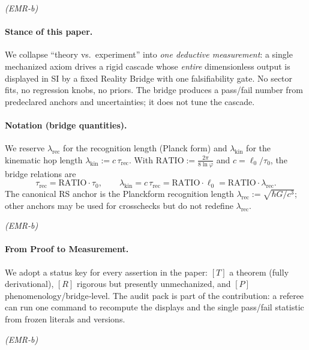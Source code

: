 \documentclass[11pt]{article}
\begin{document}
\medskip
\noindent\textit{(EMR-b)}

\paragraph{Stance of this paper.}
We collapse “theory vs.\ experiment” into \emph{one deductive measurement}: a single mechanized axiom drives a rigid cascade whose \emph{entire} dimensionless output is displayed in SI by a fixed Reality Bridge with one falsifiability gate. No sector fits, no regression knobs, no priors. The bridge produces a pass/fail number from predeclared anchors and uncertainties; it does not tune the cascade.

\medskip
\paragraph{Notation (bridge quantities).}
We reserve \( \lambda_{\mathrm{rec}} \) for the recognition length (Planck form) and \( \lambda_{\mathrm{kin}} \) for the kinematic hop length \( \lambda_{\mathrm{kin}} := c\,\tau_{\mathrm{rec}} \).
With \( \mathrm{RATIO} := \tfrac{2\pi}{8\ln\varphi} \) and \( c=\ell_{0}/\tau_{0} \), the bridge relations are
\[
  \tau_{\mathrm{rec}}=\mathrm{RATIO}\cdot\tau_{0},\qquad
  \lambda_{\mathrm{kin}} = c\,\tau_{\mathrm{rec}} = \mathrm{RATIO}\cdot \ell_{0} = \mathrm{RATIO}\cdot \lambda_{\mathrm{rec}}.
\]
The canonical RS anchor is the Planck\-form recognition length
\( \lambda_{\mathrm{rec}} := \sqrt{\hbar G / c^{3}} \); other anchors may be used for cross\-checks but do not redefine \( \lambda_{\mathrm{rec}} \).

\medskip
\noindent\textit{(EMR-b)}

\paragraph{From Proof to Measurement.}
We adopt a status key for every assertion in the paper:
\([T]\) a theorem (fully derivational),
\([R]\) rigorous but presently unmechanized, and
\([P]\) phenomenology/bridge‑level.
The audit pack is part of the contribution: a referee can run one command to recompute the displays and the single pass/fail statistic from frozen literals and versions.

\medskip
\noindent\textit{(EMR-b)}
\end{document}
